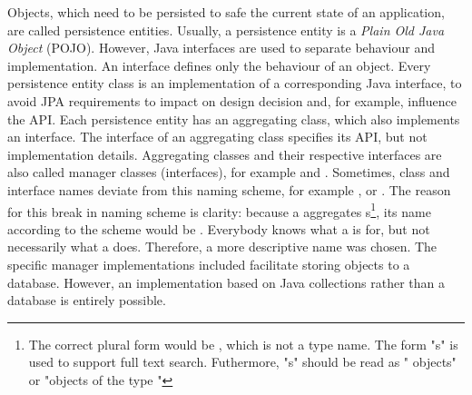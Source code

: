 Objects, which need to be persisted to safe the current state of an application, are called persistence entities.
Usually, a persistence entity is a \textit{Plain Old Java Object} (POJO).
However, Java interfaces are used to separate behaviour and implementation.
An interface defines only the behaviour of an object.
Every persistence entity class is an implementation of a corresponding Java interface, to avoid JPA requirements to impact on design decision and, for example, influence the \salespoint{} API.
Each persistence entity has an aggregating class, which also implements an interface.
The interface of an aggregating class specifies its API, but not implementation details.
Aggregating classes and their respective interfaces are also called manager classes (interfaces), for example  and .
Sometimes, class and interface names deviate from this naming scheme, for example ,  or .
The reason for this break in naming scheme is clarity: because a  aggregates s\footnote{
	The correct plural form would be , which is not a type name.
	The form "s" is used to support full text search.
	Futhermore, "s" should be read as " objects" or "objects of the type "},
its name according to the scheme would be .
Everybody knows what a  is for, but not necessarily what a  does.
Therefore, a more descriptive name was chosen.
The specific manager implementations included \salespoint{} facilitate storing objects to a database.
However, an implementation based on Java collections rather than a database is entirely possible.
\\

